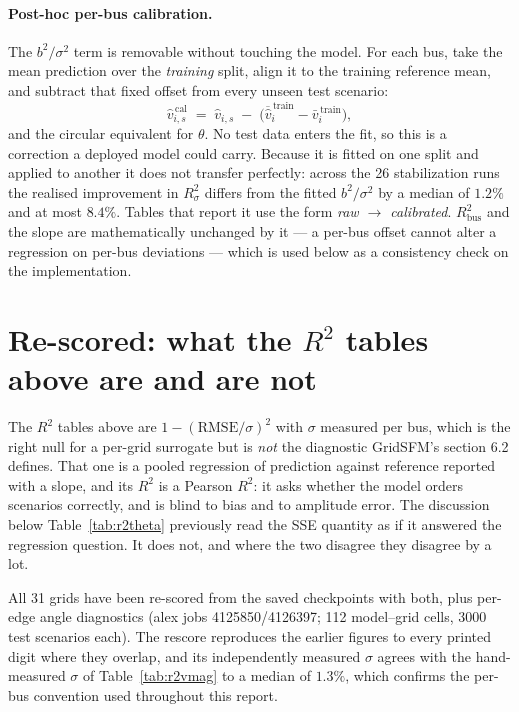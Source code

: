 \documentclass[10pt]{article}
\begin{document}
\paragraph{Post-hoc per-bus calibration.}  The $b^2/\sigma^2$ term is removable
without touching the model.  For each bus, take the mean prediction over the
\emph{training} split, align it to the training reference mean, and subtract
that fixed offset from every unseen test scenario:
\[
  \hat v^{\,\mathrm{cal}}_{i,s} \;=\; \hat v_{i,s}
  \;-\;\bigl(\overline{\hat v}^{\,\mathrm{train}}_{i}-\bar v^{\,\mathrm{train}}_{i}\bigr),
\]
and the circular equivalent for $\theta$.  No test data enters the fit, so this
is a correction a deployed model could carry.  Because it is fitted on one
split and applied to another it does not transfer perfectly: across the 26
stabilization runs the realised improvement in $R^2_{\sigma}$ differs from the
fitted $b^2/\sigma^2$ by a median of $1.2\%$ and at most $8.4\%$.  Tables that
report it use the form \emph{raw $\to$ calibrated}.  $R^2_{\mathrm{bus}}$ and the slope are
mathematically unchanged by it --- a per-bus offset cannot alter a regression
on per-bus deviations --- which is used below as a consistency check on the
implementation.

\section{Re-scored: what the $R^2$ tables above are and are not}
\label{sec:rescore}

The $R^2$ tables above are $1-(\mathrm{RMSE}/\sigma)^2$ with $\sigma$ measured
per bus, which is the right null for a per-grid surrogate but is \emph{not} the
diagnostic GridSFM's section 6.2 defines.  That one is a pooled regression of
prediction against reference reported with a slope, and its $R^2$ is a Pearson
$R^2$: it asks whether the model orders scenarios correctly, and is blind to
bias and to amplitude error.  The discussion below Table~\ref{tab:r2theta}
previously read the SSE quantity as if it answered the regression question.  It
does not, and where the two disagree they disagree by a lot.

All 31 grids have been re-scored from the saved checkpoints with both, plus
per-edge angle diagnostics (alex jobs 4125850/4126397; 112 model--grid cells,
3000 test scenarios each).  The rescore reproduces the earlier figures to every
printed digit where they overlap, and its independently measured $\sigma$
agrees with the hand-measured $\sigma$ of Table~\ref{tab:r2vmag} to a median of
$1.3\%$, which confirms the per-bus convention used throughout this report.
\end{document}
